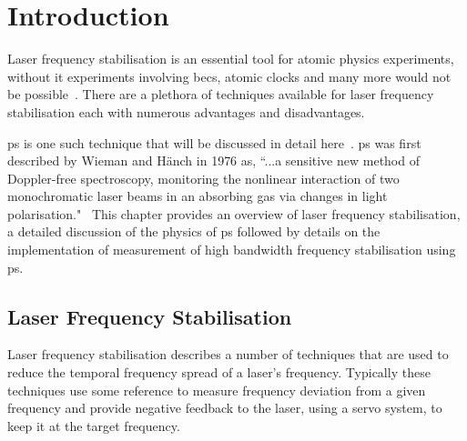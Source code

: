 \chapter{Introduction}

Laser frequency stabilisation is an essential tool for atomic physics experiments, without it experiments involving \glspl{bec}, atomic clocks and many more would not be possible~\cite{anderson_observation_1995,ye_quantum_2008}.
There are a plethora of techniques available for laser frequency stabilisation each with numerous advantages and disadvantages.

\Gls{ps} is one such technique that will be discussed in detail here~\cite{demtroder_laser_2003}.
\Gls{ps} was first described by Wieman and H\"anch in 1976 as, ``...a sensitive new method of Doppler-free spectroscopy, monitoring the nonlinear interaction of two monochromatic laser beams in an absorbing gas via changes in light polarisation."~\cite{wieman_doppler-free_1976}
This chapter provides an overview of laser frequency stabilisation, a detailed discussion of the physics of \gls{ps} followed by details on the implementation of measurement of high bandwidth frequency stabilisation using \gls{ps}.

\section{Laser Frequency Stabilisation}

Laser frequency stabilisation describes a number of techniques that are used to reduce the temporal frequency spread of a laser's frequency.
Typically these techniques use some reference to measure frequency deviation from a given frequency and provide negative feedback to the laser, using a servo system, to keep it at the target frequency.


